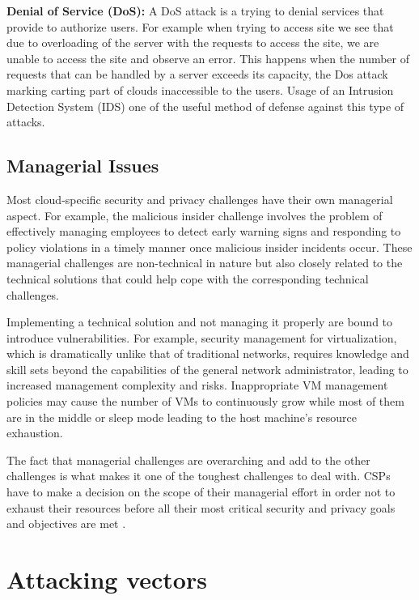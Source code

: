 \documentclass{ijitcs}
\begin{document}
\textbf{Denial of Service (DoS):} A DoS attack is a trying to denial services that provide to authorize users. For example when trying to access site we see that due to overloading of the server with the requests to access the site, we are unable to access the site and observe an error. This happens when the number of requests that can be handled by a server exceeds its capacity, the Dos attack marking carting part of clouds inaccessible to the users. Usage of an Intrusion Detection System (IDS) one of the useful method of defense against this type of attacks.

\subsection{Managerial Issues}
Most cloud-specific security and privacy challenges have their own managerial aspect. For example, the malicious insider challenge involves the problem of effectively managing employees to detect early warning signs and responding to policy violations in a timely manner once malicious insider incidents occur. These managerial challenges are non-technical in nature but also closely related to the technical solutions that could help cope with the corresponding technical challenges.

Implementing a technical solution and not managing it properly are bound to introduce vulnerabilities. For example, security management for virtualization, which is dramatically unlike that of traditional networks, requires knowledge and skill sets beyond the capabilities of the general network administrator, leading to increased management complexity and risks. Inappropriate VM management policies may cause the number of VMs to continuously grow while most of them are in the middle or sleep mode leading to the host machine’s resource exhaustion.

The fact that managerial challenges are overarching and add to the other challenges is what makes it one of the toughest challenges to deal with. CSPs have to make a decision on the scope of their managerial effort in order not to exhaust their resources before all their most critical security and privacy goals and objectives are met \cite{liu2015survey}.

\section{Attacking vectors}
\end{document}
